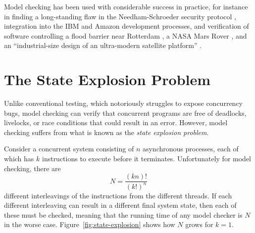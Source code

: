 \documentclass[12pt,a4paper,twoside,openright]{report}
\begin{document}
Model checking has been used with considerable
success in practice, for instance in finding
a long-standing flaw in the Needham-Schroeder
security protocol \cite{low96},
integration into the IBM \cite{sch97} and Amazon
\cite{new15}
development processes,
and verification of
software controlling a flood barrier near
Rotterdam \cite{kars96},
a NASA Mars Rover \cite{brat04},
and an ``industrial-size design of an
ultra-modern satellite platform'' \cite{est12}.

\section{The State Explosion Problem}

Unlike conventional testing, which notoriously
struggles to expose concurrency bugs,
model checking can verify that concurrent
programs are free of deadlocks, livelocks, or
race conditions that could result in
an error. However, model checking
suffers from what is known as the
\textit{state explosion problem}.

Consider a concurrent system consisting
of $n$ asynchronous processes, each of which
has $k$ instructions to execute before it
terminates. Unfortunately for model checking,
there are
\[N =\frac{(kn)!}{(k!)^n}\]
different interleavings of the instructions
from the different threads.
If each different interleaving
can result in a different final system state,
then each of these must be checked,
meaning that the running time of any model
checker is $N$ in
the worse case.
Figure~\ref{fig:state-explosion} shows
how $N$ grows for $k = 1$.
\end{document}
